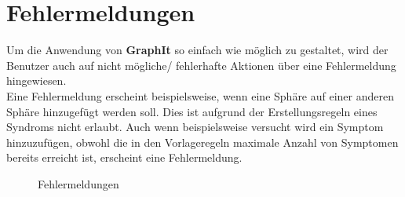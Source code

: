\documentclass[enabledeprecatedfontcommands,fontsize=11pt,paper=a4,twoside]{scrartcl}
\newcounter{one}
\begin{document}
\section{Fehlermeldungen} \label{fehlermeldungen}

Um die Anwendung von \textbf{GraphIt} so einfach wie möglich zu gestaltet, wird der Benutzer auch auf nicht mögliche/ fehlerhafte Aktionen über eine Fehlermeldung hingewiesen. \\
Eine Fehlermeldung erscheint beispielsweise, wenn eine Sphäre auf einer anderen Sphäre hinzugefügt werden soll. Dies ist aufgrund der Erstellungsregeln eines Syndroms nicht erlaubt. Auch wenn beispielsweise versucht wird ein Symptom hinzuzufügen, obwohl die in den Vorlageregeln maximale Anzahl von Symptomen bereits erreicht ist, erscheint eine Fehlermeldung.

\begin{figure}[ht!]
	\centering
	\caption{Fehlermeldungen}	
\end{figure}
\end{document}
